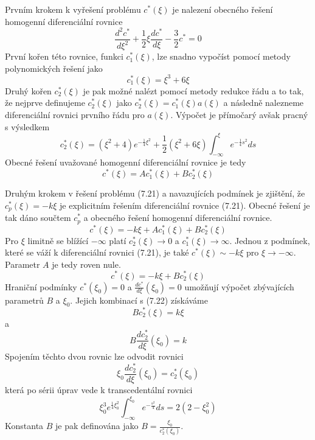\documentclass[a4paper]{book}
\begin{document}
Prvním krokem k vyřešení problému $c^*(\xi)$ je nalezení obecného řešení homogenní diferenciální rovnice
\begin{equation*}
\frac{d^2 c^*}{d \xi^2} + \frac{1}{2}\xi\frac{d c^*}{d \xi} - \frac{3}{2}c^* = 0
\end{equation*}
První kořen této rovnice, funkci $c_1^*(\xi)$, lze snadno vypočíst pomocí metody polynomických řešení jako
\begin{equation*}
c_1^*(\xi) = \xi^3 + 6 \xi
\end{equation*} 
Druhý kořen $c_2^*(\xi)$ je pak možné nalézt pomocí metody redukce řádu a to tak, že nejprve definujeme $c_2^*(\xi)$ jako $c_2^*(\xi) = c_1^*(\xi)a(\xi)$ a následně nalezneme diferenciální rovnici prvního řádu pro $a(\xi)$. Výpočet je přímočarý avšak pracný s výsledkem
\begin{equation*}
c_2^*(\xi) = (\xi^2 + 4)e^{-\frac{1}{4}\xi^2} + \frac{1}{2}(\xi^2 + 6 \xi) \int_{-\infty}^{\xi}e^{-\frac{1}{4}s^2}ds
\end{equation*}
Obecné řešení uvažované homogenní diferenciální rovnice je tedy
\begin{equation*}
c^*(\xi) = Ac_1^*(\xi) + Bc_2^*(\xi)
\end{equation*}

Druhým krokem v řešení problému (7.21) a navazujících podmínek je zjištění, že $c_p^*(\xi) = - k \xi$ je explicitním řešením diferenciální rovnice (7.21). Obecné řešení je tak dáno součtem $c_p^*$ a obecného řešení homogenní diferenciální rovnice.
\begin{equation*}
c^*(\xi) = - k \xi + A c_1^*(\xi) + B c_2^*(\xi)
\end{equation*}
Pro $\xi$ limitně se blížící $-\infty$ platí $c_2^*(\xi) \rightarrow 0$ a $c_1^*(\xi) \rightarrow \infty$. Jednou z podmínek, které se váží k diferenciální rovnici (7.21), je také $c^*(\xi) \sim -k \xi$ pro $\xi \rightarrow -\infty$. Parametr $A$ je tedy roven nule.
\begin{equation}
c^*(\xi) = - k \xi + B c_2^*(\xi)
\end{equation}
Hraniční podmínky $c^*(\xi_0) = 0$ a $\frac{d c^*}{d \xi}(\xi_0) = 0$ umožňují výpočet zbývajících parametrů $B$ a $\xi_0$. Jejich kombinací s (7.22) získáváme
\begin{equation*}
B c_2^*(\xi) = k \xi 
\end{equation*}
a
\begin{equation*}
B \frac{d c_2^*}{d \xi}(\xi_0) = k
\end{equation*}
Spojením těchto dvou rovnic lze odvodit rovnici
\begin{equation*}
\xi_0 \frac{d c_2^*}{d \xi}(\xi_0) = c_2^*(\xi_0)
\end{equation*}
která po sérii úprav vede k transcedentální rovnici
\begin{equation}
\xi_0^3e^{\frac{1}{4}\xi_0^2} \int_{-\infty}^{\xi_0} e^{-\frac{s^2}{4}}ds = 2(2 - \xi_0^2)
\end{equation}
Konstanta $B$ je pak definována jako $B = \frac{\xi_0}{c_2^*(\xi_0)}$.
\end{document}
